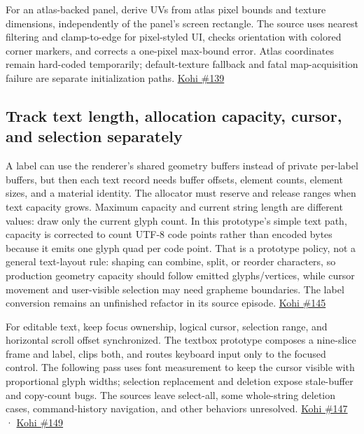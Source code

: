 For an atlas-backed panel, derive UVs from atlas pixel bounds and texture dimensions, independently of the panel's screen rectangle. The source uses nearest filtering and clamp-to-edge for pixel-styled UI, checks orientation with colored corner markers, and corrects a one-pixel max-bound error. Atlas coordinates remain hard-coded temporarily; default-texture fallback and fatal map-acquisition failure are separate initialization paths. \href{https://www.youtube.com/watch?v=-V5z1bVjl_c}{Kohi \#139}

\subsection{Track text length, allocation capacity, cursor, and selection separately}\label{05-engine-i-ch013-track-text-length-allocation-capacity-cursor-and-selection-separately}

\hypertarget{05-engine-i-ch013-track-text-length-allocation-capacity-cursor-and-selection-separately}{}

A label can use the renderer's shared geometry buffers instead of private per-label buffers, but then each text record needs buffer offsets, element counts, element sizes, and a material identity. The allocator must reserve and release ranges when text capacity grows. Maximum capacity and current string length are different values: draw only the current glyph count. In this prototype's simple text path, capacity is corrected to count UTF-8 code points rather than encoded bytes because it emits one glyph quad per code point. That is a prototype policy, not a general text-layout rule: shaping can combine, split, or reorder characters, so production geometry capacity should follow emitted glyphs/vertices, while cursor movement and user-visible selection may need grapheme boundaries. The label conversion remains an unfinished refactor in its source episode. \href{https://www.youtube.com/watch?v=HXJbWldxfj0}{Kohi \#145}

For editable text, keep focus ownership, logical cursor, selection range, and horizontal scroll offset synchronized. The textbox prototype composes a nine-slice frame and label, clips both, and routes keyboard input only to the focused control. The following pass uses font measurement to keep the cursor visible with proportional glyph widths; selection replacement and deletion expose stale-buffer and copy-count bugs. The sources leave select-all, some whole-string deletion cases, command-history navigation, and other behaviors unresolved. \href{https://www.youtube.com/watch?v=faESVT5N9gg}{Kohi \#147} · \href{https://www.youtube.com/watch?v=aWv2-QSOuO8}{Kohi \#149}

